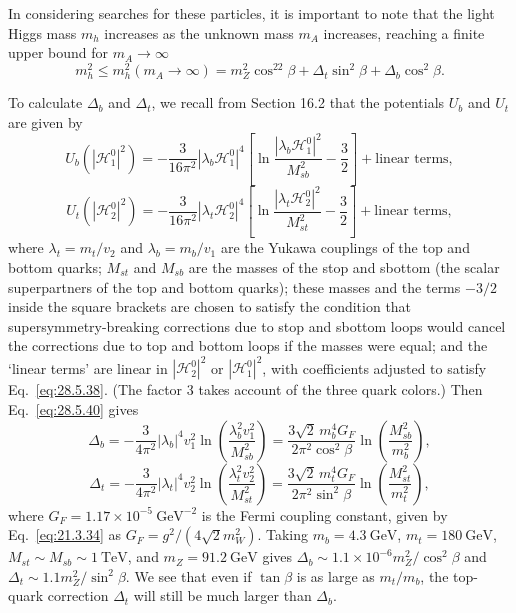 In considering searches for these particles, it is important to note that
the light Higgs mass \(m_h\) increases as the unknown mass \(m_A\)
increases, reaching a finite upper bound for
\(m_A\longrightarrow\infty\)
\begin{equation}
  m_h^2\leq m_h^2(m_A\longrightarrow\infty)
  =m_Z^2\cos^22\beta+\Delta_t\sin^2\beta+\Delta_b\cos^2\beta.
  \tag{28.5.43}\label{eq:28.5.43}
\end{equation}

To calculate \(\Delta_b\) and \(\Delta_t\), we recall from Section 16.2
that the potentials \(U_b\) and \(U_t\) are given by
\begin{equation}
  U_b(|\mathcal{H}_1^0|^2)
  =-\frac{3}{16\pi^2}|\lambda_b\mathcal{H}_1^0|^4
    \left[
      \ln\frac{|\lambda_b\mathcal{H}_1^0|^2}{M_{sb}^2}
      -\frac32
    \right]
    +\text{linear terms},
  \tag{28.5.44}\label{eq:28.5.44}
\end{equation}
\begin{equation}
  U_t(|\mathcal{H}_2^0|^2)
  =-\frac{3}{16\pi^2}|\lambda_t\mathcal{H}_2^0|^4
    \left[
      \ln\frac{|\lambda_t\mathcal{H}_2^0|^2}{M_{st}^2}
      -\frac32
    \right]
    +\text{linear terms},
  \tag{28.5.45}\label{eq:28.5.45}
\end{equation}
where \(\lambda_t=m_t/v_2\) and \(\lambda_b=m_b/v_1\) are the Yukawa
couplings of the top and bottom quarks; \(M_{st}\) and \(M_{sb}\) are the
masses of the stop and sbottom (the scalar superpartners of the top and
bottom quarks); these masses and the terms \(-3/2\) inside the square
brackets are chosen to satisfy the condition that supersymmetry-breaking
corrections due to stop and sbottom loops would cancel the corrections due
to top and bottom loops if the masses were equal; and the `linear terms'
are linear in \(|\mathcal{H}_2^0|^2\) or \(|\mathcal{H}_1^0|^2\), with
coefficients adjusted to satisfy Eq.~\eqref{eq:28.5.38}. (The factor 3
takes account of the three quark colors.) Then Eq.~\eqref{eq:28.5.40}
gives
\begin{equation}
  \Delta_b
  =-\frac{3}{4\pi^2}|\lambda_b|^4v_1^2
    \ln\left(\frac{\lambda_b^2v_1^2}{M_{sb}^2}\right)
  =\frac{3\sqrt{2}\,m_b^4G_F}{2\pi^2\cos^2\beta}
    \ln\left(\frac{M_{sb}^2}{m_b^2}\right),
  \tag{28.5.46}\label{eq:28.5.46}
\end{equation}
\begin{equation}
  \Delta_t
  =-\frac{3}{4\pi^2}|\lambda_t|^4v_2^2
    \ln\left(\frac{\lambda_t^2v_2^2}{M_{st}^2}\right)
  =\frac{3\sqrt{2}\,m_t^4G_F}{2\pi^2\sin^2\beta}
    \ln\left(\frac{M_{st}^2}{m_t^2}\right),
  \tag{28.5.47}\label{eq:28.5.47}
\end{equation}
where \(G_F=1.17\times10^{-5}\ \mathrm{GeV}^{-2}\) is the Fermi coupling
constant, given by Eq.~\eqref{eq:21.3.34} as
\(G_F=g^2/(4\sqrt{2}m_W^2)\). Taking \(m_b=4.3\ \mathrm{GeV}\),
\(m_t=180\ \mathrm{GeV}\), \(M_{st}\sim M_{sb}\sim1\ \mathrm{TeV}\), and
\(m_Z=91.2\ \mathrm{GeV}\) gives
\(\Delta_b\sim1.1\times10^{-6}m_Z^2/\cos^2\beta\) and
\(\Delta_t\sim1.1m_Z^2/\sin^2\beta\). We see that even if \(\tan\beta\)
is as large as \(m_t/m_b\), the top-quark correction \(\Delta_t\) will
still be much larger than \(\Delta_b\).

